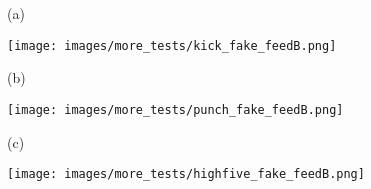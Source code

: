 \documentclass[times,twocolumn,final]{elsarticle}
\begin{document}
\begin{figure*}[t]
\centering
{}

\caption{\textcolor{black}{The example attention maps between the input character A and synthesized character B at every frame. (a) and (b) are attention maps of two \textit{shake hands} interactions, and (c) is \textit{exchange objects}, respectively. Note that the size of attention map may be varied based on the length of the interaction sequence.}}
\label{fig:attention_map}
\end{figure*}

\begin{figure*}
\centering
    \begin{minipage}{0.08\textwidth}
        (a)\quad{}
    \end{minipage}
    \begin{minipage}{0.9\textwidth}
        \texttt{[image: images/more\_tests/kick\_fake\_feedB.png]}
    \end{minipage}
    \begin{minipage}{0.08\textwidth}
        (b)\quad{}
    \end{minipage}
    \begin{minipage}{0.9\textwidth}
        \texttt{[image: images/more\_tests/punch\_fake\_feedB.png]}
    \end{minipage}
    \begin{minipage}{0.08\textwidth}
        (c)\quad{}
    \end{minipage}
    \begin{minipage}{0.9\textwidth}
        \texttt{[image: images/more\_tests/highfive\_fake\_feedB.png]}
    \end{minipage}\\
    \caption{\label{fig:more_test}\textcolor{black}{Example frames of the synthesized actions (blue character) by feeding in the reaction (red character).}}
\end{figure*}
\end{document}
